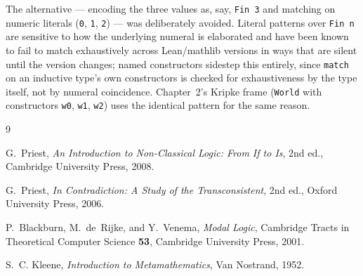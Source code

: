 The alternative — encoding the three values as, say, \texttt{Fin 3}
and matching on numeric literals (\texttt{0}, \texttt{1}, \texttt{2})
— was deliberately avoided. Literal patterns over \texttt{Fin n} are
sensitive to how the underlying numeral is elaborated and have been
known to fail to match exhaustively across Lean/mathlib versions in
ways that are silent until the version changes; named constructors
sidestep this entirely, since \texttt{match} on an inductive type's
own constructors is checked for exhaustiveness by the type itself,
not by numeral coincidence. Chapter~2's Kripke frame
(\texttt{World} with constructors \texttt{w0}, \texttt{w1},
\texttt{w2}) uses the identical pattern for the same reason.

\begin{thebibliography}{9}

G.~Priest,
\emph{An Introduction to Non-Classical Logic: From If to Is}, 2nd ed.,
Cambridge University Press, 2008.

G.~Priest,
\emph{In Contradiction: A Study of the Transconsistent}, 2nd ed.,
Oxford University Press, 2006.

P.~Blackburn, M.~de~Rijke, and Y.~Venema,
\emph{Modal Logic},
Cambridge Tracts in Theoretical Computer Science \textbf{53},
Cambridge University Press, 2001.

S.~C. Kleene,
\emph{Introduction to Metamathematics},
Van Nostrand, 1952.

\end{thebibliography}
